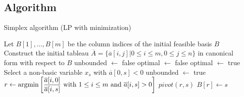 \subsection*{Algorithm}
\begin{algorithm}[H]
    \caption{Simplex algorithm (LP with minimization)}
        \begin{algorithmic}[1]
            \State Let $B[1],\dots,B[m]$ be the column indices of the initial feasible basis $B$
            \State Construct the initial tableau $\overline{A}=\{\overline{a}[i,j]|0 \leq i \leq m, 0 \leq j \leq n\}$ in canonical form with respect to $B$
            \State unbounded $\leftarrow$ false
            \State optimal $\leftarrow$ false
                    \State optimal $\leftarrow$ true
                \Else
                    \State Select a non-basic variable $x_s$ with $\overline{a}[0,s] < 0$
                        \State unbounded $\leftarrow$ true
                    \Else 
                        \State $r \leftarrow \textnormal{argmin}\left[ \dfrac{\overline{a}[i,0]}{\overline{a}[i,s]} \textnormal{ with } 1 \leq i \leq m \textnormal{ and } \overline{a}[i,s]>0\right]$
                        \State $pivot(r,s)$
                        \State $B[r] \leftarrow s$
                    \EndIf
                \EndIf
            \EndWhile
        \end{algorithmic}
\end{algorithm}

